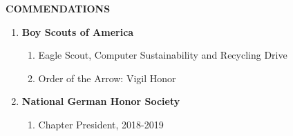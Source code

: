 \documentclass[11pt]{article}
\begin{document}
{\Large \textbf{COMMENDATIONS}}
\begin{enumerate}[label={}]
    \item \textbf{Boy Scouts of America}
          \begin{enumerate}[label={--}]
              \item Eagle Scout, Computer Sustainability and Recycling Drive
              \item Order of the Arrow: Vigil Honor
          \end{enumerate}
    \item \textbf{National German Honor Society}
          \begin{enumerate}[label={--}]
              \item Chapter President, 2018-2019
          \end{enumerate}
\end{enumerate}
\end{document}
